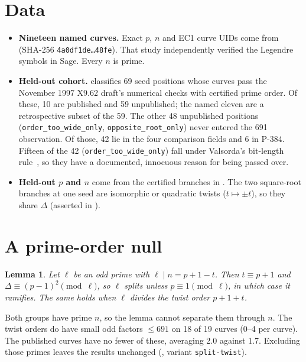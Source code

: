 \documentclass[11pt,a4paper]{article}
\theoremstyle{plain}
\newtheorem{lemma}{Lemma}
\begin{document}
\section{Data}\label{sec:data}

\begin{itemize}
\item \textbf{Nineteen named curves.} Exact $p$, $n$ and EC1 curve UIDs come
  from 
  (SHA-256 \texttt{4a0df1de\ldots48fe}). That study independently verified the
  Legendre symbols in Sage. Every $n$ is prime.
\item \textbf{Held-out cohort.}
   classifies
  69 seed positions whose curves pass the November 1997 X9.62 draft's
  numerical checks with certified prime order. Of these, 10 are published and
  59 unpublished; the named eleven are a retrospective subset of the 59. The
  other 48 unpublished positions (\texttt{order\_too\_wide\_only},
  \texttt{opposite\_root\_only}) never entered the 691 observation. Of those,
  42 lie in the four comparison fields and 6 in P-384. Fifteen of the 42
  (\texttt{order\_too\_wide\_only}) fall under Valsorda's bit-length
  rule~\cite{valsorda2026seeds}, so they have a documented, innocuous reason
  for being passed over.
\item \textbf{Held-out $p$ and $n$} come from the certified branches in
  .
  The two square-root branches at one seed are isomorphic or quadratic twists
  ($t \mapsto \pm t$), so they share $\Delta$ (asserted in
  ).
\end{itemize}

\section{A prime-order null}\label{sec:null}

\begin{lemma}
Let $\ell$ be an odd prime with $\ell \mid n = p + 1 - t$. Then
$t \equiv p + 1$ and $\Delta \equiv (p-1)^2 \pmod{\ell}$, so $\ell$ splits
unless $p \equiv 1 \pmod{\ell}$, in which case it ramifies. The same holds
when $\ell$ divides the twist order $p + 1 + t$.
\end{lemma}

Both groups have prime $n$, so the lemma cannot separate them through $n$. The
twist orders do have small odd factors $\le 691$ on 18 of 19 curves (0--4 per
curve). The published curves have no fewer of these, averaging 2.0 against
1.7. Excluding those primes leaves the results unchanged
(, variant \texttt{split-twist}).
\end{document}

